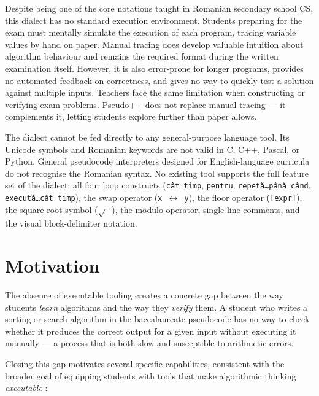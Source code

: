 Despite being one of the core notations taught in Romanian secondary school CS,
this dialect has no standard execution environment.  Students preparing for
the exam must mentally simulate the execution of each program, tracing
variable values by hand on paper.  Manual tracing does develop valuable intuition about algorithm behaviour
and remains the required format during the written examination itself.
However, it is also error-prone for longer programs, provides no
automated feedback on correctness, and gives no way to quickly test
a solution against multiple inputs.
Teachers face the same limitation when constructing or verifying exam problems.
Pseudo++ does not replace manual tracing --- it complements it, letting
students explore further than paper allows.

The dialect cannot be fed directly to any general-purpose language tool.
Its Unicode symbols and Romanian keywords are not valid in C, C++, Pascal,
or Python.  General pseudocode interpreters designed for English-language
curricula do not recognise the Romanian syntax.  No existing tool supports
the full feature set of the dialect: all four loop constructs
(\texttt{cât timp}, \texttt{pentru}, \texttt{repetă\ldots până când},
\texttt{execută\ldots cât timp}), the swap operator (\texttt{x $\leftrightarrow$ y}),
the floor operator (\texttt{[expr]}), the square-root symbol ($\sqrt{\phantom{x}}$),
the modulo operator, single-line comments, and the visual block-delimiter notation.

\section{Motivation}
\label{sec:motivation}

The absence of executable tooling creates a concrete gap between the way
students \emph{learn} algorithms and the way they \emph{verify} them.
A student who writes a sorting or search algorithm in the baccalaureate
pseudocode has no way to check whether it produces the correct output for a
given input without executing it manually — a process that is both slow and
susceptible to arithmetic errors.

Closing this gap motivates several specific capabilities, consistent with
the broader goal of equipping students with tools that make algorithmic
thinking \emph{executable} \cite{wing2006ct}:

